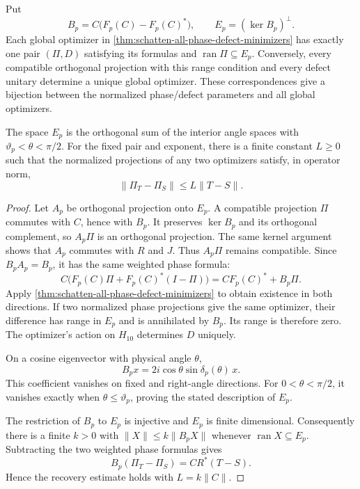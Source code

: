 \begin{theorem}
\label{thm:schatten-normalized-parameters}
Put
\[
 B_p=C\bigl(F_p(C)-F_p(C)^*\bigr),\qquad E_p=(\ker B_p)^\perp.
\]
Each global optimizer in
\cref{thm:schatten-all-phase-defect-minimizers} has exactly one pair
$(\Pi,D)$ satisfying its formulas and $\operatorname{ran}\Pi\subseteq E_p$.
Conversely, every compatible orthogonal projection with this range
condition and every defect unitary determine a unique global optimizer.
These correspondences give a bijection between the normalized
phase/defect parameters and all global optimizers.

The space $E_p$ is the orthogonal sum of the interior angle spaces with
$\vartheta_p<\theta<\pi/2$. For the fixed pair and exponent, there is a
finite constant $L\geq0$ such that the normalized projections of any two
optimizers satisfy, in operator norm,
\[
 \|\Pi_T-\Pi_S\|\leq L\|T-S\|.
\]
\end{theorem}

\begin{proof}
Let $A_p$ be orthogonal projection onto $E_p$.
A compatible projection $\Pi$ commutes with $C$, hence with $B_p$.
It preserves $\ker B_p$ and its orthogonal complement, so $A_p\Pi$ is
an orthogonal projection. The same kernel argument shows that $A_p$
commutes with $R$ and $J$. Thus $A_p\Pi$ remains compatible. Since
$B_pA_p=B_p$, it has the same weighted phase formula:
\[
 C\bigl(F_p(C)\Pi+F_p(C)^*(I-\Pi)\bigr)
       =CF_p(C)^*+B_p\Pi.
\]
Apply \cref{thm:schatten-all-phase-defect-minimizers} to obtain existence
in both directions. If two normalized phase projections give the same
optimizer, their difference has range in $E_p$ and is annihilated by
$B_p$. Its range is therefore zero. The optimizer's action on $H_{10}$
determines $D$ uniquely.

On a cosine eigenvector with physical angle $\theta$,
\[
 B_px=2i\cos\theta\sin\delta_p(\theta)\,x.
\]
This coefficient vanishes on fixed and right-angle directions. For
$0<\theta<\pi/2$, it vanishes exactly when
$\theta\leq\vartheta_p$, proving the stated description of $E_p$.

The restriction of $B_p$ to $E_p$ is injective and $E_p$ is finite
dimensional. Consequently there is a finite $k>0$ with
$\|X\|\leq k\|B_pX\|$ whenever $\operatorname{ran}X\subseteq E_p$.
Subtracting the two weighted phase formulas gives
\[
 B_p(\Pi_T-\Pi_S)=CR^*(T-S).
\]
Hence the recovery estimate holds with $L=k\|C\|$.
\end{proof}

